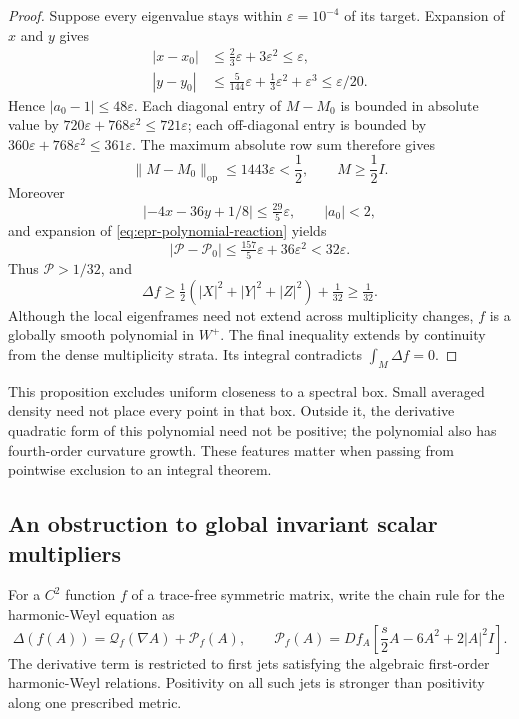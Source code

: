 \begin{proof}
Suppose every eigenvalue stays within
$\varepsilon=10^{-4}$ of its target.  Expansion of $x$ and $y$ gives
\begin{align*}
 |x-x_0|&\leq\tfrac23\varepsilon+3\varepsilon^2
                                      \leq\varepsilon,\\
 |y-y_0|&\leq\tfrac5{144}\varepsilon
              +\tfrac13\varepsilon^2+\varepsilon^3
                                      \leq\varepsilon/20.
\end{align*}
Hence $|a_0-1|\leq48\varepsilon$.
Each diagonal entry of $M-M_0$ is bounded in absolute value by
$720\varepsilon+768\varepsilon^2\leq721\varepsilon$;
each off-diagonal entry is bounded by
$360\varepsilon+768\varepsilon^2\leq361\varepsilon$.
The maximum absolute row sum therefore gives
\begin{equation}\label{eq:epr-matrix-margin}
 \|M-M_0\|_{\mathrm{op}}\leq1443\varepsilon<\frac12,
 \qquad M\geq\frac12I.
\end{equation}
Moreover
\[
 |-4x-36y+1/8|\leq\tfrac{29}{5}\varepsilon,
 \qquad |a_0|<2,
\]
and expansion of \eqref{eq:epr-polynomial-reaction} yields
\[
 |\mathcal P-\mathcal P_0|
 \leq\tfrac{157}{5}\varepsilon+36\varepsilon^2
 <32\varepsilon.
\]
Thus $\mathcal P>1/32$, and
\begin{equation}\label{eq:epr-positive-laplacian}
 \Delta f\geq\tfrac12(|X|^2+|Y|^2+|Z|^2)+\tfrac1{32}
 \geq\tfrac1{32}.
\end{equation}
Although the local eigenframes need not extend across multiplicity
changes, $f$ is a globally smooth polynomial in $W^+$.
The final inequality extends by continuity from the dense
multiplicity strata.  Its integral contradicts $\int_M\Delta f=0$.
\end{proof}

This proposition excludes uniform closeness to a spectral box.  Small
averaged density need not place every point in that box.  Outside it,
the derivative quadratic form of this polynomial need not be positive;
the polynomial also has fourth-order curvature growth.  These features
matter when passing from pointwise exclusion to an integral theorem.

\subsection{An obstruction to global invariant scalar multipliers}

For a $C^2$ function $f$ of a trace-free symmetric matrix, write the
chain rule for the harmonic-Weyl equation as
\[
 \Delta(f(A))=\mathcal Q_f(\nabla A)
              +\mathcal P_f(A),\qquad
 \mathcal P_f(A)=Df_A\left[\frac{s}{2}A-6A^2+2|A|^2I\right].
\]
The derivative term is restricted to first jets satisfying the
algebraic first-order harmonic-Weyl relations.  Positivity on all such
jets is stronger than positivity along one prescribed metric.

